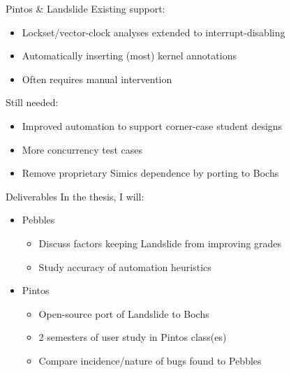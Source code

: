 \documentclass[xcolor=dvipsnames]{beamer}
\begin{document}
\begin{frame}{Pintos \& Landslide}
	Existing support:
	\begin{itemize}
		\item Lockset/vector-clock analyses extended to interrupt-disabling
		\item Automatically inserting (most) kernel annotations
		\item Often requires manual intervention
	\end{itemize}
	\linegap

	Still needed:
	\begin{itemize}
		\item Improved automation to support corner-case student designs
		\item More concurrency test cases
		\item Remove proprietary Simics dependence by porting to Bochs
	\end{itemize}
\end{frame}

\begin{frame}{Deliverables}
	In the thesis, I will:
	\begin{itemize}
		\item Pebbles
		\begin{itemize}
			\item Discuss factors keeping Landslide from improving grades
			\item Study accuracy of automation heuristics
		\end{itemize}
		\item Pintos
		\begin{itemize}
			\item Open-source port of Landslide to Bochs
			\item 2 semesters of user study in Pintos class(es)
			\item Compare incidence/nature of bugs found to Pebbles
		\end{itemize}
	\end{itemize}
\end{frame}

\end{document}
